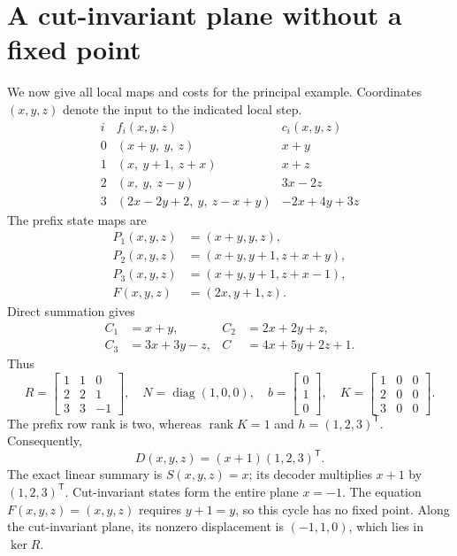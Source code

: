 \documentclass[11pt,a4paper]{article}
\theoremstyle{definition}\newtheorem{definition}[theorem]{Definition}\newtheorem{example}[theorem]{Example}\newtheorem{remark}[theorem]{Remark}
\DeclareMathOperator{\rank}{rank}\DeclareMathOperator{\im}{im}\DeclareMathOperator{\spanop}{span}\DeclareMathOperator{\diag}{diag}
\begin{document}
\section{A cut-invariant plane without a fixed point}
We now give all local maps and costs for the principal example.
Coordinates $(x,y,z)$ denote the input to the indicated local step.
\begin{equation}\label{eq:examplemaps}
 \begin{array}{c|c|c}
 i&f_i(x,y,z)&c_i(x,y,z)\\\hline
 0&(x+y,\ y,\ z)&x+y\\
 1&(x,\ y+1,\ z+x)&x+z\\
 2&(x,\ y,\ z-y)&3x-2z\\
 3&(2x-2y+2,\ y,\ z-x+y)&-2x+4y+3z
 \end{array}
\end{equation}
The prefix state maps are
\[
 \begin{aligned}
 P_1(x,y,z)&=(x+y,y,z),\\
 P_2(x,y,z)&=(x+y,y+1,z+x+y),\\
 P_3(x,y,z)&=(x+y,y+1,z+x-1),\\
 F(x,y,z)&=(2x,y+1,z).
 \end{aligned}
\]
Direct summation gives
\begin{equation}\label{eq:examplecosts}
 \begin{aligned}
 C_1&=x+y,& C_2&=2x+2y+z,\\
 C_3&=3x+3y-z,& C&=4x+5y+2z+1.
 \end{aligned}
\end{equation}
Thus
\begin{equation}\label{eq:examplematrices}
 R=\begin{bmatrix}1&1&0\\2&2&1\\3&3&-1\end{bmatrix},\quad
 N=\diag(1,0,0),\quad b=\begin{bmatrix}0\\1\\0\end{bmatrix},\quad
 K=\begin{bmatrix}1&0&0\\2&0&0\\3&0&0\end{bmatrix}.
\end{equation}
The prefix row rank is two, whereas $\rank K=1$ and
$h=(1,2,3)^{\mathsf T}$. Consequently,
\begin{equation}\label{eq:exampledefects}
 \boxed{D(x,y,z)=(x+1)(1,2,3)^{\mathsf T}.}
\end{equation}
The exact linear summary is $S(x,y,z)=x$; its decoder multiplies
$x+1$ by $(1,2,3)^{\mathsf T}$. Cut-invariant states form the entire
plane $x=-1$. The equation $F(x,y,z)=(x,y,z)$ requires $y+1=y$, so
this cycle has no fixed point. Along the cut-invariant plane, its
nonzero displacement is $(-1,1,0)$, which lies in $\ker R$.
\end{document}
